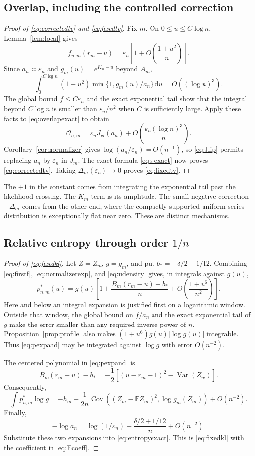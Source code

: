 \documentclass[11pt,a4paper]{article}
\numberwithin{equation}{section}
\theoremstyle{definition}
\theoremstyle{remark}
\newcommand{\E}{\mathbb E}
\newcommand{\Var}{\operatorname{Var}}
\newcommand{\Cov}{\operatorname{Cov}}
\newcommand{\eps}{\varepsilon}
\newcommand{\ov}{\mathcal O}
\newcommand{\dd}{\mathrm d}
\begin{document}
\subsection{Overlap, including the controlled correction}
\begin{proof}[Proof of \eqref{eq:correctedtv} and \eqref{eq:fixedtv}]
Fix $m$. On $0\le u\le C\log n$, Lemma~\ref{lem:local} gives
\[
f_{n,m}(r_m-u)=\eps_n\left[1+O\!\left(\frac{1+u^2}{n}\right)\right].
\]
Since $a_n\asymp\eps_n$ and $g_m(u)=e^{K_m-u}$ beyond $A_m$,
\[
\int_0^{C\log n}(1+u^2)\min\{1,g_m(u)/a_n\}\,\dd u
 =O((\log n)^3).
\]
The global bound $f\le C\eps_n$ and the exact exponential tail show
that the integral beyond $C\log n$ is smaller than
$\eps_n/n^2$ when $C$ is sufficiently large. Apply these facts to
\eqref{eq:overlapexact} to obtain
\[
\ov_{n,m}=\eps_n J_m(a_n)
           +O\!\left(\frac{\eps_n(\log n)^3}{n}\right).
\]
Corollary~\ref{cor:normalizer} gives $\log(a_n/\eps_n)=O(n^{-1})$,
so \eqref{eq:Jlip} permits replacing $a_n$ by $\eps_n$ in $J_m$.
The exact formula \eqref{eq:Jexact} now proves
\eqref{eq:correctedtv}. Taking $\Delta_m(\eps_n)\to0$ proves
\eqref{eq:fixedtv}.
\end{proof}
The $+1$ in the constant comes from integrating the exponential tail
past the likelihood crossing. The $K_m$ term is its amplitude. The
small negative correction $-\Delta_m$ comes from the other end, where
the compactly supported uniform-series distribution is exceptionally
flat near zero. These are distinct mechanisms.

\subsection{Relative entropy through order \texorpdfstring{$1/n$}{1/n}}
\begin{proof}[Proof of \eqref{eq:fixedkl}]
Let $Z=Z_m$, $g=g_m$, and put $b_*=-\delta/2-1/12$. Combining
\eqref{eq:firstf}, \eqref{eq:normalizerexp}, and
\eqref{eq:udensity} gives, in integrals against $g(u)$,
\begin{equation}\label{eq:pexpand}
p^*_{n,m}(u)=g(u)\left[1+\frac{B_m(r_m-u)-b_*}{n}
              +O\!\left(\frac{1+u^6}{n^2}\right)\right].
\end{equation}
Here and below an integral expansion is justified first on a logarithmic
window. Outside that window, the global bound on $f/a_n$ and the exact
exponential tail of $g$ make the error smaller than any required inverse
power of $n$. Proposition~\ref{prop:profile} also makes
$(1+u^6)g(u)|\log g(u)|$ integrable. Thus \eqref{eq:pexpand} may be
integrated against $\log g$ with error $O(n^{-2})$.

The centered polynomial in \eqref{eq:pexpand} is
\[
B_m(r_m-u)-b_*
 =-\frac12\left[(u-r_m-1)^2-\Var(Z_m)\right].
\]
Consequently,
\[
\int p^*_{n,m}\log g
 =-h_m-\frac1{2n}
    \Cov\!\left((Z_m-\E Z_m)^2,\log g_m(Z_m)\right)+O(n^{-2}).
\]
Finally,
\[
-\log a_n=\log(1/\eps_n)+\frac{\delta/2+1/12}{n}+O(n^{-2}).
\]
Substitute these two expansions into \eqref{eq:entropyexact}. This is
\eqref{eq:fixedkl} with the coefficient in \eqref{eq:Ecoeff}.
\end{proof}
\end{document}
